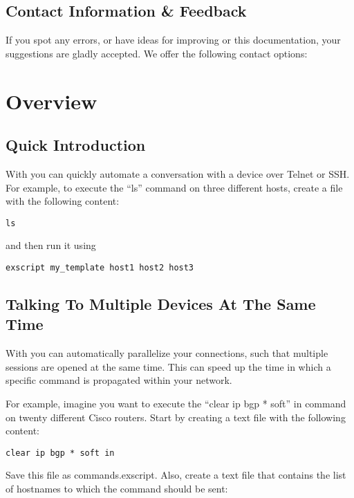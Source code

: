 \subsection{Contact Information \& Feedback}

If you spot any errors, or have ideas for improving \product or this 
documentation, your suggestions are gladly accepted.
We offer the following contact options: \\



\newpage
\section{Overview}
\subsection{Quick Introduction}

With \product you can quickly automate a conversation with a device over 
Telnet or SSH. For example, to execute the ``ls'' command on three different 
hosts, create a file with the following content: 

\begin{lstlisting}
ls
\end{lstlisting}

and then run it using

\begin{lstlisting}
exscript my_template host1 host2 host3
\end{lstlisting}


\subsection{Talking To Multiple Devices At The Same Time}

With \product you can automatically parallelize your connections, such that 
multiple sessions are opened at the same time. This can speed up the time 
in which a specific command is propagated within your network.

For example, imagine you want to execute the ``clear ip bgp * soft'' in 
command on twenty different Cisco routers. Start by creating a text file 
with the following content: 

\begin{lstlisting}
clear ip bgp * soft in
\end{lstlisting}

Save this file as commands.exscript. Also, create a text file that contains 
the list of hostnames to which the command should be sent: 

